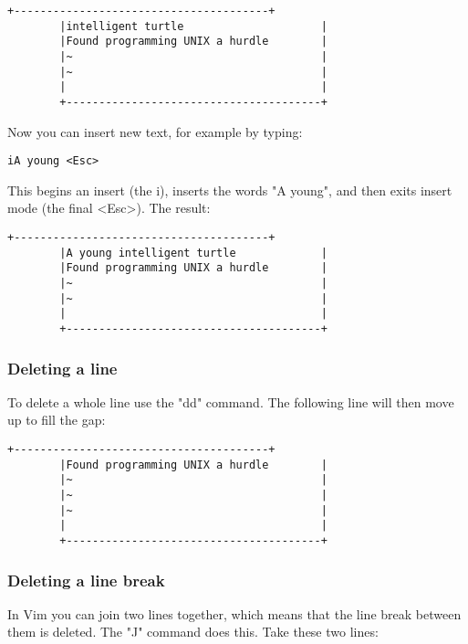 		\begin{Verbatim}[samepage=true]
		+---------------------------------------+
		|intelligent turtle                     |
		|Found programming UNIX a hurdle        |
		|~                                      |
		|~                                      |
		|                                       |
		+---------------------------------------+
		\end{Verbatim}

Now you can insert new text, for example by typing:

 \begin{Verbatim}[samepage=true]
 iA young <Esc>
 \end{Verbatim}

This begins an insert (the i), inserts the words "A young", and then exits insert mode (the final <Esc>).
 The result: 
		\begin{Verbatim}[samepage=true]
		+---------------------------------------+
		|A young intelligent turtle             |
		|Found programming UNIX a hurdle        |
		|~                                      |
		|~                                      |
		|                                       |
		+---------------------------------------+
		\end{Verbatim}

\subsubsection{Deleting a line}

To delete a whole line use the "dd" command.
The following line will then move up to fill the gap: 

		\begin{Verbatim}[samepage=true]
		+---------------------------------------+
		|Found programming UNIX a hurdle        |
		|~                                      |
		|~                                      |
		|~                                      |
		|                                       |
		+---------------------------------------+
		\end{Verbatim}

\subsubsection{Deleting a line break}

In Vim you can join two lines together, which means that the line break between them is deleted.
The "J" command does this.
Take these two lines: 

